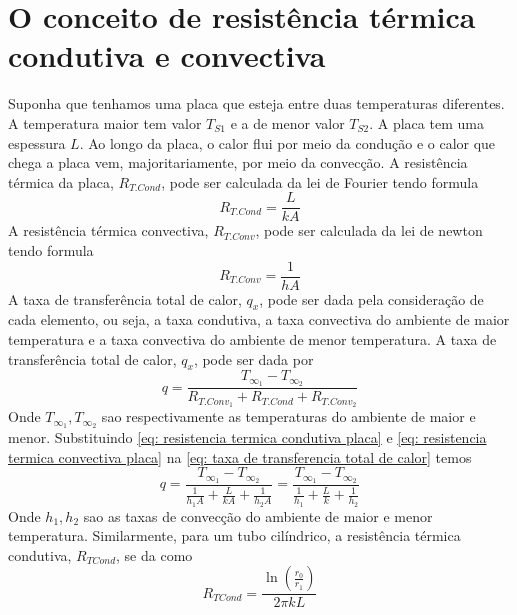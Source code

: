\section{O conceito de resistência térmica condutiva e convectiva}
Suponha que tenhamos uma placa que esteja entre duas temperaturas diferentes. A temperatura maior
tem valor \(T_{S1}\)  e a de menor valor \(T_{S2}\). A placa tem uma espessura \(L\). Ao longo da
placa, o calor flui por meio da condução e o calor que chega a placa vem, majoritariamente, por meio
da convecção. A resistência térmica da placa, \(R_{T. Cond}\), pode ser calculada da lei de Fourier
tendo formula
\begin{equation}\label{eq: resistencia termica condutiva placa}
    R_{T. Cond} = \frac{L}{kA}
\end{equation}
A resistência térmica convectiva, \(R_{T. Conv}\), pode ser calculada da lei de newton tendo formula
\begin{equation}\label{eq: resistencia termica convectiva placa}
    R_{T. Conv} = \frac{1}{hA}
\end{equation}
A taxa de transferência total de calor, \(q_{x}\), pode ser dada pela consideração de cada elemento,
ou seja, a taxa condutiva, a taxa convectiva do ambiente de maior temperatura e a taxa convectiva do
ambiente de menor temperatura. A taxa de transferência total de calor, \(q_{x}\), pode ser dada por
\begin{equation}\label{eq: taxa de transferencia total de calor}
    q = \frac{T_{\infty_1} - T_{\infty_2}}{R_{T. Conv_1} + R_{T. Cond} + R_{T. Conv_2}}
\end{equation}
Onde \(T_{\infty_1 }, T_{\infty_2}\) sao respectivamente as temperaturas do ambiente de maior e
menor. Substituindo \eqref{eq: resistencia termica condutiva placa} e \eqref{eq: resistencia termica
convectiva placa} na \eqref{eq: taxa de transferencia total de calor} temos
\begin{equation}\label{eq: taxa de transferencia total de calor 2}
        q = \frac{T_{\infty_1} - T_{\infty_2}}{\frac{1}{h_1A} + \frac{L}{kA} + \frac{1}{h_2A}} = \frac{T_{\infty_1} - T_{\infty_2}}{\frac{1}{h_1} + \frac{L}{k} + \frac{1}{h_2}}
\end{equation}
Onde \(h_1,h_2\) sao as taxas de convecção do ambiente de maior e menor temperatura. Similarmente,
para um tubo cilíndrico, a resistência térmica condutiva, \(R_{TCond}\), se da como
\begin{equation}\label{eq: resistencia termica condutiva tubo}
    R_{TCond} = \frac{\ln \left(\frac{r_0}{r_1} \right)}{2\pi k L}
\end{equation}
